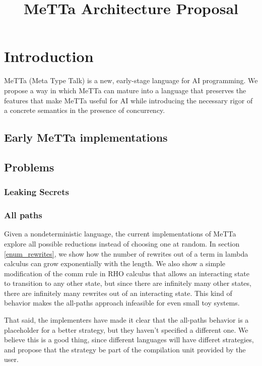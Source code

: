 \documentclass{article}
\title{MeTTa Architecture Proposal}
\author{}
\date{}
\begin{document}
\maketitle

\section{Introduction}

MeTTa (Meta Type Talk) is a new, early-stage language for AI programming.  We propose a way in which MeTTa can mature into a language that preserves the features that make MeTTa useful for AI while introducing the necessary rigor of a concrete semantics in the presence of concurrency.

\subsection{Early MeTTa implementations}

\subsection{Problems}

\subsubsection{Leaking Secrets}

\subsubsection{All paths}

Given a nondeterministic language, the current implementations of MeTTa explore all possible reductions instead of choosing one at random.  In section \ref{enum_rewrites}, we show how the number of rewrites out of a term in lambda calculus can grow exponentially with the length.  We also show a simple modification of the comm rule in RHO calculus that allows an interacting state to transition to any other state, but since there are infinitely many other states, there are infinitely many rewrites out of an interacting state.  This kind of behavior makes the all-paths approach infeasible for even small toy systems.

That said, the implementers have made it clear that the all-paths behavior is a placeholder for a better strategy, but they haven't specified a different one.  We believe this is a good thing, since different languages will have differet strategies, and propose that the strategy be part of the compilation unit provided by the user.
\end{document}
